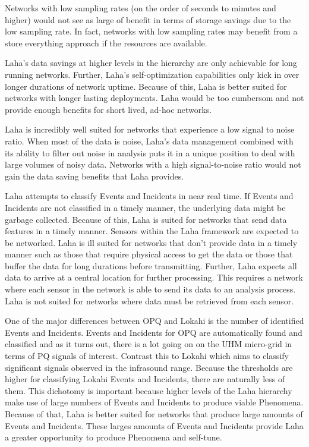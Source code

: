 Networks with low sampling rates (on the order of seconds to minutes and higher) would not see as large of benefit in terms of storage savings due to the low sampling rate. In fact, networks with low sampling rates may benefit from a store everything approach if the resources are available.

Laha's data savings at higher levels in the hierarchy are only achievable for long running networks. Further, Laha's self-optimization capabilities only kick in over longer durations of network uptime. Because of this, Laha is better suited for networks with longer lasting deployments. Laha would be too cumbersom and not provide enough benefits for short lived, ad-hoc networks.

Laha is incredibly well suited for networks that experience a low signal to noise ratio. When most of the data is noise, Laha's data management combined with its ability to filter out noise in analysis puts it in a unique position to deal with large volumes of noisy data. Networks with a high signal-to-noise ratio would not gain the data saving benefits that Laha provides.

Laha attempts to classify Events and Incidents in near real time. If Events and Incidents are not classified in a timely manner, the underlying data might be garbage collected. Because of this, Laha is suited for networks that send data features in a timely manner. Sensors within the Laha framework are expected to be networked. Laha is ill suited for networks that don't provide data in a timely manner such as those that require physical access to get the data or those that buffer the data for long durations before transmitting. Further, Laha expects all data to arrive at a central location for further processing. This requires a network where each sensor in the network is able to send its data to an analysis process. Laha is not suited for networks where data must be retrieved from each sensor.

One of the major differences between OPQ and Lokahi is the number of identified Events and Incidents. Events and Incidents for OPQ are automatically found and classified and as it turns out, there is a lot going on on the UHM micro-grid in terms of PQ signals of interest. Contrast this to Lokahi which aims to classify significant signals observed in the infrasound range. Because the thresholds are higher for classifying Lokahi Events and Incidents, there are naturally less of them. This dichotomy is important because higher levels of the Laha hierarchy make use of large numbers of Events and Incidents to produce viable Phenomena. Because of that, Laha is better suited for networks that produce large amounts of Events and Incidents. These larges amounts of Events and Incidents provide Laha a greater opportunity to produce Phenomena and self-tune.

